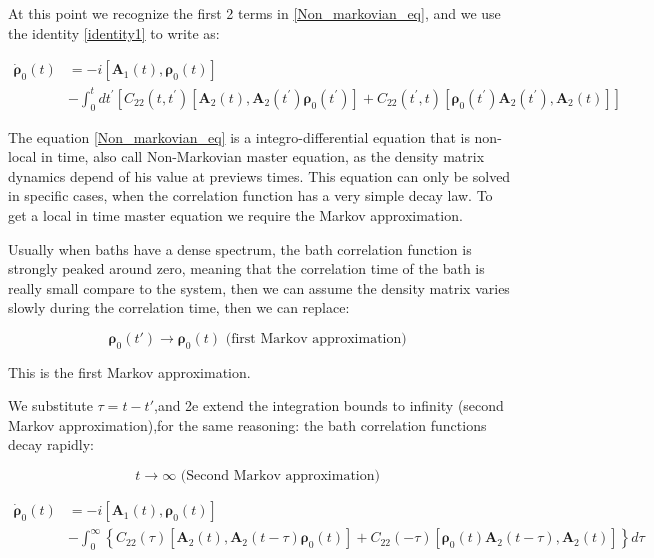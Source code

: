 \documentclass[%
preprint,
onecolumn,
notitlepag,
 amsmath,amssymb,
 aps,
 pra,
]{revtex4-2}
\begin{document}
At this point we recognize the first 2 terms in \eqref{Non_markovian_eq}, and we use the identity \eqref{identity1} to write as: 

\begin{equation}
\begin{aligned}
\dot{\boldsymbol{\rho}}_0(t) &=  -i \left[ \boldsymbol{A}_1(t) , \boldsymbol{\rho}_0(t) \right] \\
& - \int_{0}^{t} d t^{\prime}\left[C_{22}\left(t, t^{\prime}\right)\left[\boldsymbol{A}_2(t), \boldsymbol{A}_2\left(t^{\prime}\right) \boldsymbol{\rho}_0 \left(t^{\prime}\right)\right] +C_{22}\left(t^{\prime}, t\right)\left[\boldsymbol{\rho}_0 \left(t^{\prime}\right) \boldsymbol{A}_2 \left(t^{\prime}\right), \boldsymbol{A}_2 (t)\right]\right] 
\end{aligned}
\label{Non_markovian_eq}
\end{equation}





The equation \ref{Non_markovian_eq} is a integro-differential equation that is non-local in time, also call Non-Markovian master equation, as the density matrix dynamics depend of  his value at previews times. This equation can only be solved in specific cases, when the correlation function has a very simple decay law. To get a local in time master equation we require  the Markov approximation.

Usually when baths have a dense spectrum, the bath correlation function is strongly peaked around zero, meaning that the correlation time of the bath is really small compare to the system, then we can assume the density matrix varies slowly during the correlation time, then  we can replace: 


\begin{equation}
\boldsymbol{\rho}_0(t') \rightarrow \boldsymbol{\rho}_0(t) \text { (first Markov approximation) }
\end{equation}

This is the first Markov approximation.  

We substitute $\tau=t-t'$,and 2e extend the integration bounds
to infinity (second Markov approximation),for the same reasoning: the bath correlation
functions decay rapidly: 

\begin{equation}
t \rightarrow \infty \text { (Second Markov approximation) }
\end{equation}


\begin{equation}
\begin{aligned}
\dot{\boldsymbol{\rho}}_0(t) &=  -i \left[ \boldsymbol{A}_1(t) , \boldsymbol{\rho}_0(t) \right] \\
& - \int_{0}^{\infty}\left\{C_{22}(\tau)\left[\boldsymbol{A}_2(t), \boldsymbol{A}_2(t-\tau) \boldsymbol{\rho}_{\mathrm{0}}(t)\right]+C_{22}(-\tau)\left[\boldsymbol{\rho}_{\mathrm{0}}(t) \boldsymbol{A}_2(t-\tau), \boldsymbol{A}_2(t)\right]\right\} d \tau
\end{aligned}
\label{Non_markovian_eq}
\end{equation}
\end{document}
